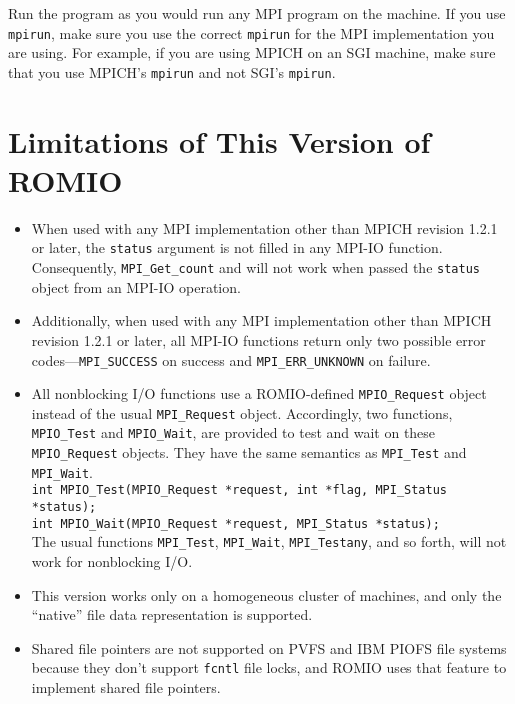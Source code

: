 Run the program as you would run any MPI program on the machine.
If you use {\tt mpirun}, make sure you use the correct {\tt mpirun}
for the MPI implementation you are using. For example, if you
are using MPICH on an SGI machine, make sure that you use MPICH's
{\tt mpirun} and not SGI's {\tt mpirun}.


%
%
\section{Limitations of This Version of ROMIO \label{sec:limit}}

\begin{itemize}
\item When used with any MPI implementation other than MPICH revision
1.2.1 or later, the {\tt status} argument is not filled in any MPI-IO
function. Consequently, {\tt MPI\_Get\_count} and will not work when passed the {\tt status} object
from an MPI-IO operation.

\item Additionally, when used with any MPI implementation other than MPICH
revision 1.2.1 or later, all MPI-IO functions return only two possible
error codes---{\tt MPI\_SUCCESS} on success and {\tt MPI\_ERR\_UNKNOWN}
on failure.

\item All nonblocking I/O functions use a ROMIO-defined {\tt MPIO\_Request}
object instead of the usual {\tt MPI\_Request} object. Accordingly, two
functions, {\tt MPIO\_Test} and {\tt MPIO\_Wait}, are provided to test
and wait on these {\tt MPIO\_Request} objects. They have the same
semantics as {\tt MPI\_Test} and {\tt MPI\_Wait}.\\
\hspace*{.4in} {\tt int MPIO\_Test(MPIO\_Request *request, int *flag, MPI\_Status *status);}\\
\hspace*{.4in} {\tt int MPIO\_Wait(MPIO\_Request *request, MPI\_Status *status);}\\
The usual functions {\tt MPI\_Test}, {\tt MPI\_Wait}, {\tt MPI\_Testany},
and so forth, will not work for nonblocking I/O. 

\item This version works only on a homogeneous cluster of machines,
and only the ``native'' file data representation is supported.

\item Shared file pointers are not supported on PVFS and IBM PIOFS
file systems because they don't support {\tt fcntl} file locks,
and ROMIO uses that feature to implement shared file pointers.


\end{itemize}
